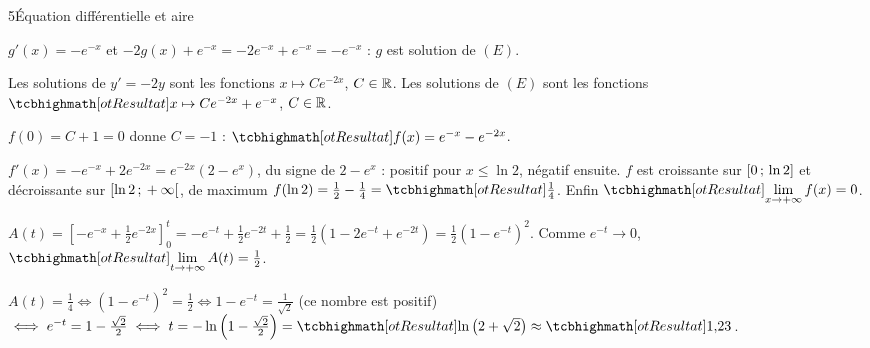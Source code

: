 \begin{corrigeBac}{5}{Équation différentielle et aire}
\begin{questions}
  \item $g'(x)=-e^{-x}$ et $-2g(x)+e^{-x}=-2e^{-x}+e^{-x}=-e^{-x}$ : $g$ est solution de $(E)$. 
  \item Les solutions de $y'=-2y$ sont les fonctions $x\mapsto Ce^{-2x}$, $C\in\mathbb{R}$. Les solutions de $(E)$ sont les fonctions
    $\res{x\mapsto Ce^{-2x}+e^{-x}}$, $C\in\mathbb{R}$. \pts{1 pt}
  \item $f(0)=C+1=0$ donne $C=-1$ : $\res{f(x)=e^{-x}-e^{-2x}}$. 
  \item $f'(x)=-e^{-x}+2e^{-2x}=e^{-2x}\left(2-e^{x}\right)$, du signe de $2-e^{x}$ : positif pour $x\leq\ln2$, négatif ensuite. $f$ est
    croissante sur $\mathopen{[}0\,{;}\,\ln2\mathclose{]}$ et décroissante sur $\mathopen{[}\ln2\,{;}\,+\infty\mathclose{[}$, de maximum $f(\ln2)=\frac12-\frac14=\res{\tfrac14}$. Enfin
    $\res{\lim\limits_{x\to+\infty}f(x)=0}$. 
  \item $A(t)=\left[-e^{-x}+\frac12e^{-2x}\right]_0^{t}=-e^{-t}+\frac12e^{-2t}+\frac12=\frac12\left(1-2e^{-t}+e^{-2t}\right)=\frac12\left(1-e^{-t}\right)^{2}$.
    Comme $e^{-t}\to0$, $\res{\lim\limits_{t\to+\infty}A(t)=\tfrac12}$. \pts{1 pt}
  \item $A(t)=\frac14\iff\left(1-e^{-t}\right)^{2}=\frac12\iff1-e^{-t}=\frac{1}{\sqrt2}$ (ce nombre est positif) $\iff
    e^{-t}=1-\frac{\sqrt2}{2}\iff t=-\ln\left(1-\tfrac{\sqrt2}{2}\right)=\res{\ln\big(2+\sqrt2\big)}\approx\res{1{,}23}$. 
\end{questions}
\end{corrigeBac}
